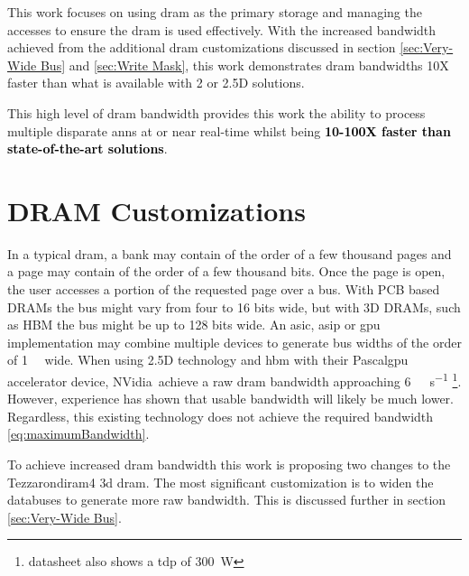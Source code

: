This work focuses on using \ac{dram} as the primary storage and managing the accesses to ensure the \ac{dram} is used effectively. 
With the increased bandwidth achieved from the additional \ac{dram} customizations discussed in section \ref{sec:Very-Wide Bus} and \ref{sec:Write Mask}, this work demonstrates \ac{dram} bandwidths 10X faster than what is available with 2 or 2.5D solutions.

This high level of \ac{dram} bandwidth provides this work the ability to process multiple disparate \acp{ann} at or near real-time whilst being \textbf{\textcolor{black}{10-100X faster than state-of-the-art solutions}}.


\section{DRAM Customizations}

In a typical \ac{dram}, a bank may contain of the order of a few thousand pages and a page may contain of the order of a few thousand bits.
Once the page is open, the user accesses a portion of the requested page over a bus. With PCB based DRAMs the bus might vary from four to 16 bits wide, but with 3D DRAMs, such as HBM the bus might be up to 128 bits wide.
An \ac{asic}, \ac{asip} or \ac{gpu} implementation may combine multiple devices to generate bus widths of the order of \SI[per-mode=symbol]{1}{\kilo \bit} wide. 
When using 2.5D technology and \ac{hbm} with their Pascal\texttrademark \ac{gpu} accelerator device, NVidia\textregistered ~achieve a raw \ac{dram} bandwidth approaching \SI[per-mode=symbol]{6}{\tera \bit \per \second} \cite{Nvidia_p100_summary_datasheet}\footnote{datasheet also shows a \ac{tdp} of \SI[per-mode=symbol]{300}{\watt}}.
However, experience has shown \cite{farabet2011neuflow} \cite{tensorflow2015-whitepaper} that usable bandwidth will likely be much lower.
Regardless, this existing technology does not achieve the required bandwidth \eqref{eq:maximumBandwidth}.



To achieve increased \ac{dram} bandwidth this work is proposing two changes to the Tezzaron\textregistered \ac{diram4} \cite{tezzaron:diram4} \ac{3d} \ac{dram}. 
The most significant customization is to widen the databuses to generate more raw bandwidth. This is discussed further in section \ref{sec:Very-Wide Bus}.

